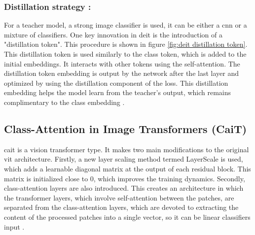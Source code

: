 \subsubsection*{Distillation strategy :}

For a teacher model, a strong image classifier is used, it can be either a \gls{cnn} or a mixture of classifiers. One key innovation in \gls{deit} is the introduction of a "distillation token". This procedure is shown in figure \ref{fig:deit distillation token}. This distillation token is used similarly to the class token, which is added to the initial embeddings. It interacts with other tokens using the self-attention. The distillation token embedding is output by the network after the last layer and optimized by using the distillation component of the loss. This distillation embedding helps the model learn from the teacher's output, which remains complimentary to the class embedding \cite{pmlr-v139-touvron21a}.

\subsection{Class-Attention in Image Transformers (CaiT)}

\gls{cait} is a vision transformer type. It makes two main modifications to the original \gls{vit} architecture. Firstly, a new layer scaling method termed LayerScale is used, which adds a learnable diagonal matrix at the output of each residual block. This matrix is initialized close to 0, which improves the training dynamics. Secondly, class-attention layers are also introduced. This creates an architecture in which the transformer layers, which involve self-attention between the patches, are separated from the class-attention layers, which are devoted to extracting the content of the processed patches into a single vector, so it can be linear classifiers input \cite{touvron2021going}.

